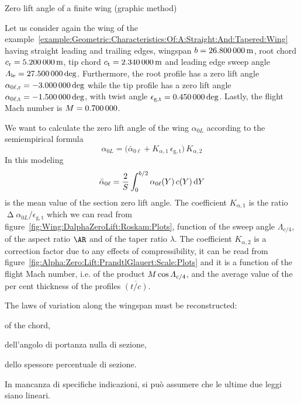 \documentclass[[12pt,twoside]{book}
\begin{document}
%
\begin{myExampleX}{Zero lift angle of a finite wing (graphic method)}{\ \myIconGraph\ }%
\label{example:Zero:Lift:Angle:Graphic:Method}
%

%
\noindent
Let us consider again the wing of the example~\ref{example:Geometric:Characteristics:Of:A:Straight:And:Tapered:Wing} having straight leading and trailing edges, wingspan $b=\SI[round-precision=1]{\mySpanWingMT}{\metre}$,
root chord $c_\mathrm{r}=\SI[round-precision=2]{\myChordRootWingMT}{\metre}$,
tip chord $c_\mathrm{t}=\SI[round-precision=2]{\myChordTipWingMT}{\metre}$
and leading edge sweep angle
$\Lambda_\mathrm{le}=\SI[round-precision=1]{\mySweepLEWingDEG}{\deg}$.
Furthermore, the root profile has a zero lift angle
$\alpha_{0\ell,\mathrm{r}}=\SI[round-precision=1]{\myAlphaZeroLiftRootWingDEG}{\deg}$
while the tip profile has a zero lift angle
$\alpha_{0\ell,\mathrm{t}}=\SI[round-precision=1]{\myAlphaZeroLiftTipWingDEG}{\deg}$,
with twist angle
$\epsilon_{\mathrm{g,t}}=\SI[round-precision=1]{\myTwistWingDEG}{\deg}$.
Lastly, the flight Mach number is $\Mach=\SI[round-precision=2]{\myMach}{}$.

We want to calculate the zero lift angle of the wing $\alpha_{0L}$ 
according to the semiempirical formula
\begin{equation}
\label{eq:Wing:Alpha:Zero:Lift:Roskam:Datcom}
\alpha_{0L} =
  \Big(
    \bar{\alpha}_{0\ell} + K_{\alpha,1} \, \epsilon_{\mathrm{g,t}}
  \Big) 
  \, K_{\alpha,2}
\end{equation}
In this modeling
\[
\bar{\alpha}_{0\ell} = \frac{2}{S} \int_0^{b/2} \alpha_{0\ell}(Y)\, c(Y) \diff{Y}
\]
is the mean value of the section zero lift angle.
The coefficient
$K_{\alpha,1}$ is the ratio
$\upDelta\alpha_{0L}/\epsilon_{\mathrm{g,t}}$ which we can read from
figure~\ref{fig:Wing:DalphaZeroLift:Roskam:Plots},
function of the sweep angle $\Lambda_{c/4}$, of the aspect ratio $\AR$
and of the taper ratio $\lambda$.
The coefficient
$K_{\alpha,2}$ is a correction factor due to any
effects of compressibility, it can be read from figure~\ref{fig:Alpha:Zero:Lift:PrandtlGlauert:Scale:Plots}
and it is a function of the flight Mach number, i.e. of the product $\Mach\cos\Lambda_{c/4}$,
and the average value of the per cent thickness of the profiles $\overline{(t/c)}$.

\medskip

The laws of variation along the wingspan must be reconstructed:%
\begin{inparaenum}
\item
of the chord,
\item
dell'angolo di portanza nulla di sezione, 
\item
dello spessore percentuale di sezione.
\end{inparaenum}
In mancanza di specifiche indicazioni, si può assumere
che le ultime due leggi siano lineari.


\end{myExampleX}
\end{document}
